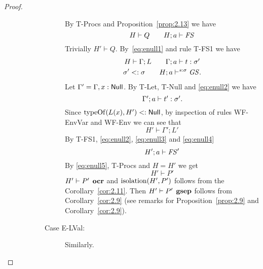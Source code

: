 \begin{proof}
\begin{description}
\begin{description}
\begin{description}
              By {\sc T-Procs} and Proposition~\ref{prop:2.13} we have 
              \begin{equation} \label{eq:enull1}
               H \vdash Q  \quad\quad H; a \vdash \mathit{FS} 
              \end{equation}
              Trivially $H' \vdash Q$. 
              By~\eqref{eq:enull1} and rule {\sc T-FS1} we have
              \begin{equation} \label{eq:enull2}
                \begin{gathered}
                  H \vdash \Gamma; L \quad\quad \mbox{$\Gamma;a\vdash t:\sigma'$} \\
                  \sigma' <: \sigma \quad\quad H; a \vdash^{s: \sigma} \mathit{GS}.
                \end{gathered}
              \end{equation}
              Let $\Gamma' = \Gamma, x: \mbox{$\mathsf{Null}$}$. By {\sc T-Let}, {\sc
              T-Null} and \eqref{eq:enull2} we have
              \begin{equation} \label{eq:enull3}
                \mbox{$\Gamma';a\vdash t':\sigma'$}.
              \end{equation}
              Since $\mbox{$\mathrm{typeOf}$}(L(x), H') <: \mbox{$\mathsf{Null}$}$, by inspection of rules
              {\sc WF-EnvVar} and {\sc WF-Env} we can see that
              \begin{equation} \label{eq:enull4}
                H' \vdash \Gamma';L'
              \end{equation}
              By {\sc T-FS1}, \eqref{eq:enull2}, \eqref{eq:enull3} and \eqref{eq:enull4}
              \begin{equation}\label{eq:enull5}
                H';a \vdash \mathit{FS}'
              \end{equation}
              By \eqref{eq:enull5}, {\sc T-Procs} and $H = H'$ we get  
              \begin{equation}
                H' \vdash P'
              \end{equation}
              $H' \vdash P' \:\: \mbox{\bf ocr}$ and $\mbox{$\mathrm{isolation}$}{(H', P')}$ follows from
              the Corollary~\ref{cor:2.11}. Then $H' \vdash P'
              \:\: \mbox{\bf gsep}$ follows from Corollary~\ref{cor:2.9} (see remarks
              for Proposition~\ref{prop:2.9} and Corollary~\ref{cor:2.9}).

            \item[Case {\sc E-LVal}:] Similarly.


\end{description}
\end{description}
\end{description}
\end{proof}
